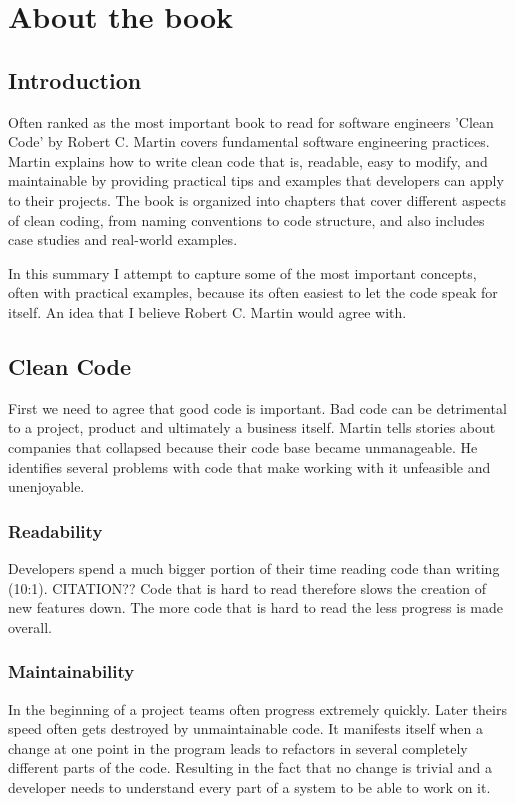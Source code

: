 \section{About the book}

\subsection{Introduction}

Often ranked as the most important book to read for software engineers 'Clean Code' by Robert C. Martin covers fundamental software engineering practices. Martin explains how to write clean code that is, readable, easy to modify, and maintainable by providing practical tips and examples that developers can apply to their projects. The book is organized into chapters that cover different aspects of clean coding, from naming conventions to code structure, and also includes case studies and real-world examples.

In this summary I attempt to capture some of the most important concepts, often with practical examples, because its often easiest to let the code speak for itself. An idea that I believe Robert C. Martin would agree with.

\subsection{Clean Code}
First we need to agree that good code is important. Bad code can be detrimental to a project, product and ultimately a business itself. Martin tells stories about companies that collapsed because their code base became unmanageable. He identifies several problems with code that make working with it unfeasible and unenjoyable.

\subsubsection{Readability}
Developers spend a much bigger portion of their time reading code than writing (10:1). CITATION?? Code that is hard to read therefore slows the creation of new features down. The more code that is hard to read the less progress is made overall.

\subsubsection{Maintainability}
In the beginning of a project teams often progress extremely quickly. Later theirs speed often gets destroyed by unmaintainable code. It manifests itself when a change at one point in the program leads to refactors in several completely different parts of the code. Resulting in the fact that no change is trivial and a developer needs to understand every part of a system to be able to work on it.

